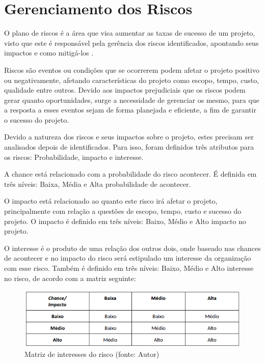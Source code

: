 \chapter[Gerenciamento dos Riscos]{Gerenciamento dos Riscos}

O plano de riscos é a área que visa aumentar as taxas de sucesso de um projeto, visto que este é responsável pela gerência dos riscos identificados, apontando seus impactos e como mitigá-los \cite{pmbok2004}.

Riscos são eventos ou condições que se ocorrerem podem afetar o projeto positivo ou negativamente, afetando características do projeto como escopo, tempo, custo, qualidade entre outros. Devido aos impactos prejudiciais que os riscos podem gerar quanto oportunidades, surge a necessidade de gerenciar os mesmo, para que a resposta a esses eventos sejam de forma planejada e eficiente, a fim de garantir o sucesso do projeto.

Devido a natureza dos riscos e seus impactos sobre o projeto, estes precisam ser analisados depois de identificados. Para isso, foram definidos três atributos para os riscos: Probabilidade, impacto e interesse. 

A chance está relacionado com a probabilidade do risco acontecer. É definida em três níveis: Baixa, Média e Alta probabilidade de acontecer.

O impacto está relacionado ao quanto este risco irá afetar o projeto, principalmente com relação a questões de escopo, tempo, custo e sucesso do projeto. O impacto é definido em três níveis: Baixo, Médio e Alto impacto no projeto.

O interesse é o produto de uma relação dos outros dois, onde baseado nas chances de acontecer e no impacto do risco será estipulado um interesse da organização com esse risco. Também é definido em três níveis: Baixo, Médio e Alto interesse no risco, de acordo com a matriz seguinte:

\begin{figure}[!ht]
\centering
\includegraphics[scale=0.60, angle = 360]{figuras/risco1}
\caption{Matriz de interesses do risco (fonte: Autor)}
\label{Matriz de interesses do risco (fonte: Autor)}
\end{figure}
\FloatBarrier

